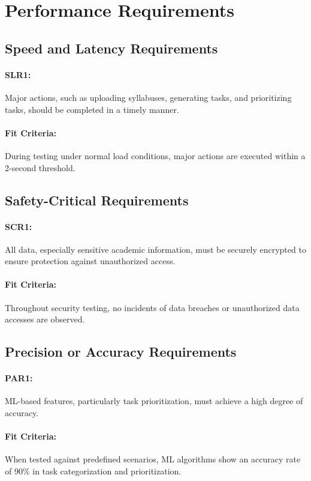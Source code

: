 \documentclass[12pt]{article}
\begin{document}
\section{Performance Requirements}

\subsection{Speed and Latency Requirements}
\paragraph{SLR1:} Major actions, such as uploading syllabuses, generating tasks, and prioritizing tasks, should be completed in a timely manner.
\paragraph{Fit Criteria:} During testing under normal load conditions, major actions are executed within a 2-second threshold.

\subsection{Safety-Critical Requirements}
\paragraph{SCR1:} All data, especially sensitive academic information, must be securely encrypted to ensure protection against unauthorized access.
\paragraph{Fit Criteria:} Throughout security testing, no incidents of data breaches or unauthorized data accesses are observed.

\subsection{Precision or Accuracy Requirements}
\paragraph{PAR1:} ML-based features, particularly task prioritization, must achieve a high degree of accuracy.
\paragraph{Fit Criteria:} When tested against predefined scenarios, ML algorithms show an accuracy rate of 90\% in task categorization and prioritization.
\end{document}
